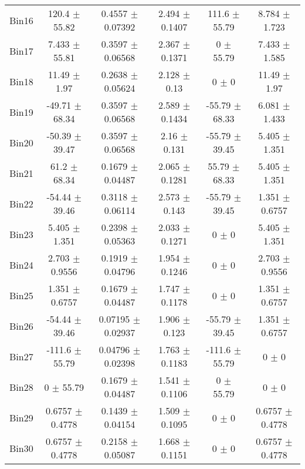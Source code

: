 \begin{tabular}{@{\extracolsep{4pt}}lccccc@{}}
     Bin16 & 120.4 $\pm$ 55.82 & 0.4557 $\pm$ 0.07392 & 2.494 $\pm$ 0.1407 & 111.6 $\pm$ 55.79 & 8.784 $\pm$ 1.723 \\ 
     Bin17 & 7.433 $\pm$ 55.81 & 0.3597 $\pm$ 0.06568 & 2.367 $\pm$ 0.1371 & 0 $\pm$ 55.79 & 7.433 $\pm$ 1.585 \\ 
     Bin18 & 11.49 $\pm$ 1.97 & 0.2638 $\pm$ 0.05624 & 2.128 $\pm$ 0.13 & 0 $\pm$ 0 & 11.49 $\pm$ 1.97 \\ 
     Bin19 & -49.71 $\pm$ 68.34 & 0.3597 $\pm$ 0.06568 & 2.589 $\pm$ 0.1434 & -55.79 $\pm$ 68.33 & 6.081 $\pm$ 1.433 \\ 
     Bin20 & -50.39 $\pm$ 39.47 & 0.3597 $\pm$ 0.06568 & 2.16 $\pm$ 0.131 & -55.79 $\pm$ 39.45 & 5.405 $\pm$ 1.351 \\ 
     Bin21 & 61.2 $\pm$ 68.34 & 0.1679 $\pm$ 0.04487 & 2.065 $\pm$ 0.1281 & 55.79 $\pm$ 68.33 & 5.405 $\pm$ 1.351 \\ 
     Bin22 & -54.44 $\pm$ 39.46 & 0.3118 $\pm$ 0.06114 & 2.573 $\pm$ 0.143 & -55.79 $\pm$ 39.45 & 1.351 $\pm$ 0.6757 \\ 
     Bin23 & 5.405 $\pm$ 1.351 & 0.2398 $\pm$ 0.05363 & 2.033 $\pm$ 0.1271 & 0 $\pm$ 0 & 5.405 $\pm$ 1.351 \\ 
     Bin24 & 2.703 $\pm$ 0.9556 & 0.1919 $\pm$ 0.04796 & 1.954 $\pm$ 0.1246 & 0 $\pm$ 0 & 2.703 $\pm$ 0.9556 \\ 
     Bin25 & 1.351 $\pm$ 0.6757 & 0.1679 $\pm$ 0.04487 & 1.747 $\pm$ 0.1178 & 0 $\pm$ 0 & 1.351 $\pm$ 0.6757 \\ 
     Bin26 & -54.44 $\pm$ 39.46 & 0.07195 $\pm$ 0.02937 & 1.906 $\pm$ 0.123 & -55.79 $\pm$ 39.45 & 1.351 $\pm$ 0.6757 \\ 
     Bin27 & -111.6 $\pm$ 55.79 & 0.04796 $\pm$ 0.02398 & 1.763 $\pm$ 0.1183 & -111.6 $\pm$ 55.79 & 0 $\pm$ 0 \\ 
     Bin28 & 0 $\pm$ 55.79 & 0.1679 $\pm$ 0.04487 & 1.541 $\pm$ 0.1106 & 0 $\pm$ 55.79 & 0 $\pm$ 0 \\ 
     Bin29 & 0.6757 $\pm$ 0.4778 & 0.1439 $\pm$ 0.04154 & 1.509 $\pm$ 0.1095 & 0 $\pm$ 0 & 0.6757 $\pm$ 0.4778 \\ 
     Bin30 & 0.6757 $\pm$ 0.4778 & 0.2158 $\pm$ 0.05087 & 1.668 $\pm$ 0.1151 & 0 $\pm$ 0 & 0.6757 $\pm$ 0.4778 \\ 
\hline\hline
  \end{tabular}
